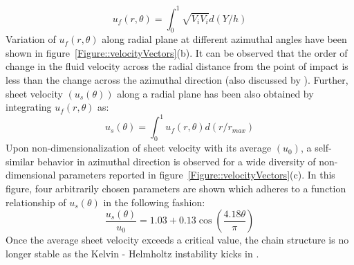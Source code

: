 \documentclass{jfm}
\begin{document}
\begin{equation}\label{Equation::uf}
u_f(r,\theta) = \int_{0}^{1}\sqrt{V_iV_i}d(Y/h)
\end{equation}
Variation of $u_f(r,\theta)$ along radial plane at different azimuthal angles have been shown in figure~\ref{Figure::velocityVectors}(b). It can be observed that the order of change in the fluid velocity across the radial distance from the point of impact is less than the change across the azimuthal direction (also discussed by \cite{choo2002velocity}). Further, sheet velocity $\left(u_s(\theta)\right)$ along a radial plane has been also obtained by integrating $u_f(r,\theta)$ as: %
\begin{equation}\label{Equation::us}
u_s(\theta) = \int_{0}^{1}u_f(r,\theta)d(r/r_{max})
\end{equation} 
Upon non-dimensionalization of sheet velocity with its average $\left(u_0\right)$, a self-similar behavior in azimuthal direction is observed for a wide diversity of non-dimensional parameters reported in figure~\ref{Figure::velocityVectors}(c). In this figure, four arbitrarily chosen parameters are shown which adheres to a function relationship of $u_s(\theta)$ in the following fashion: 
\begin{equation}\label{Equation::usu0}
\frac{u_s(\theta)}{u_0} = 1.03 + 0.13\cos\left(\frac{4.18\theta}{\pi}\right)
\end{equation}
Once the average sheet velocity exceeds a critical value, the chain structure is no longer stable as the  Kelvin - Helmholtz instability kicks in \citep{villermaux2002life}. \\
\end{document}
